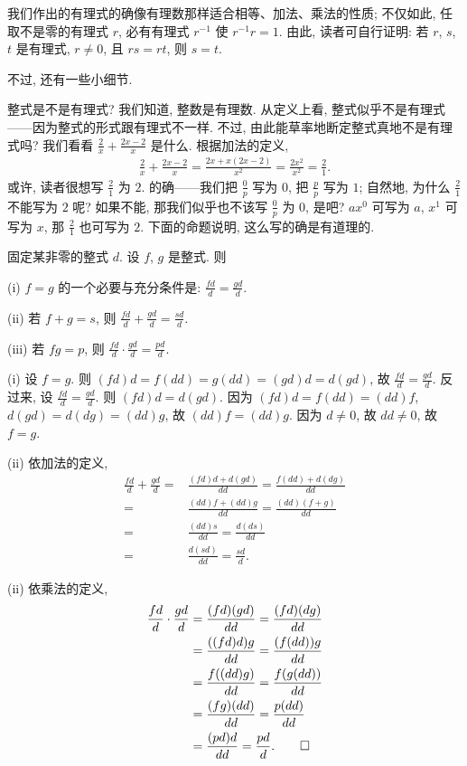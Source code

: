 我们作出的有理式的确像有理数那样适合相等、加法、乘法的性质; 不仅如此, 任取不是零的有理式 $r$, 必有有理式 $r^{-1}$ 使 $r^{-1} r = 1$. 由此, 读者可自行证明: 若 $r$, $s$, $t$ 是有理式, $r \neq 0$, 且 $rs = rt$, 则 $s = t$.

不过, 还有一些小细节.

整式是不是有理式? 我们知道, 整数是有理数. 从定义上看, 整式似乎不是有理式——因为整式的形式跟有理式不一样. 不过, 由此能草率地断定整式真地不是有理式吗? 我们看看 $\frac{2}{x} + \frac{2x-2}{x}$ 是什么. 根据加法的定义,
\begin{align*}
    \frac{2}{x} + \frac{2x-2}{x} = \frac{2x + x(2x-2)}{x^2} = \frac{2x^2}{x^2} = \frac{2}{1}.
\end{align*}
或许, 读者很想写 $\frac{2}{1}$ 为 $2$. 的确——我们把 $\frac{0}{p}$ 写为 $0$, 把 $\frac{p}{p}$ 写为 $1$; 自然地, 为什么 $\frac{2}{1}$ 不能写为 $2$ 呢? 如果不能, 那我们似乎也不该写 $\frac{0}{p}$ 为 $0$, 是吧? $ax^0$ 可写为 $a$, $x^1$ 可写为 $x$, 那 $\frac{2}{1}$ 也可写为 $2$. 下面的命题说明, 这么写的确是有道理的.

\begin{proposition}
    固定某非零的整式 $d$. 设 $f$, $g$ 是整式. 则

    (i) $f = g$ 的一个必要与充分条件是: $\frac{fd}{d} = \frac{gd}{d}$.

    (ii) 若 $f + g = s$, 则 $\frac{fd}{d} + \frac{gd}{d} = \frac{sd}{d}$.

    (iii) 若 $fg = p$, 则 $\frac{fd}{d} \cdot \frac{gd}{d} = \frac{pd}{d}$.
\end{proposition}

\begin{pf}
    (i) 设 $f = g$. 则 $(fd)d = f(dd) = g(dd) = (gd)d = d(gd)$, 故 $\frac{fd}{d} = \frac{gd}{d}$. 反过来, 设 $\frac{fd}{d} = \frac{gd}{d}$. 则 $(fd)d = d(gd)$. 因为 $(fd)d = f(dd) = (dd)f$, $d(gd) = d(dg) = (dd)g$, 故 $(dd)f = (dd)g$. 因为 $d \neq 0$, 故 $dd \neq 0$, 故 $f = g$.

    (ii) 依加法的定义,
    \begin{align*}
        \frac{fd}{d} + \frac{gd}{d}
        = {} & \frac{(fd)d + d(gd)}{dd} = \frac{f(dd) + d(dg)}{dd} \\
        = {} & \frac{(dd)f + (dd)g}{dd} = \frac{(dd)(f + g)}{dd}   \\
        = {} & \frac{(dd)s}{dd} = \frac{d(ds)}{dd}                 \\
        = {} & \frac{d(sd)}{dd} = \frac{sd}{d}.
    \end{align*}

    (ii) 依乘法的定义,
    \begin{align*}
        \frac{fd}{d} \cdot \frac{gd}{d}
        = {} & \frac{(fd)(gd)}{dd} = \frac{(fd)(dg)}{dd} \\
        = {} & \frac{((fd)d)g}{dd} = \frac{(f(dd))g}{dd} \\
        = {} & \frac{f((dd)g)}{dd} = \frac{f(g(dd))}{dd} \\
        = {} & \frac{(fg)(dd)}{dd} = \frac{p(dd)}{dd}    \\
        = {} & \frac{(pd)d}{dd} = \frac{pd}{d}. \qedhere
    \end{align*}
\end{pf}

